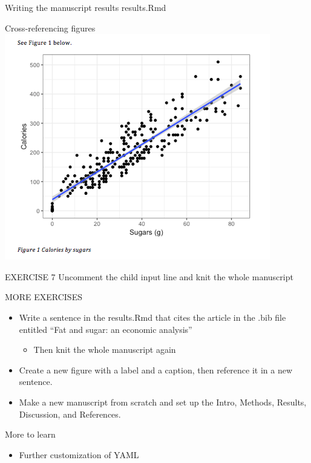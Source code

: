 \documentclass[
  ignorenonframetext,
]{beamer}
\providecommand{\tightlist}{%
  \setlength{\itemsep}{0pt}\setlength{\parskip}{0pt}}
\begin{document}
\begin{frame}[fragile]{Writing the manuscript results \textbar{}
results.Rmd}
\begin{block}{Cross-referencing figures}
\includegraphics{images/fig_xref_output.png}

\end{block}

\begin{block}{EXERCISE 7 \textbar{} Uncomment the child input line and
knit the whole manuscript}

\end{block}

\begin{block}{MORE EXERCISES}

\begin{itemize}
\item
  Write a sentence in the results.Rmd that cites the article in the .bib
  file entitled ``Fat and sugar: an economic analysis''

  \begin{itemize}
  \tightlist
  \item
    Then knit the whole manuscript again
  \end{itemize}
\item
  Create a new figure with a label and a caption, then reference it in a
  new sentence.
\item
  Make a new manuscript from scratch and set up the Intro, Methods,
  Results, Discussion, and References.
\end{itemize}

\end{block}

\begin{block}{More to learn}

\begin{itemize}
\tightlist
\item
  Further customization of YAML


\end{itemize}
\end{block}
\end{frame}
\end{document}
